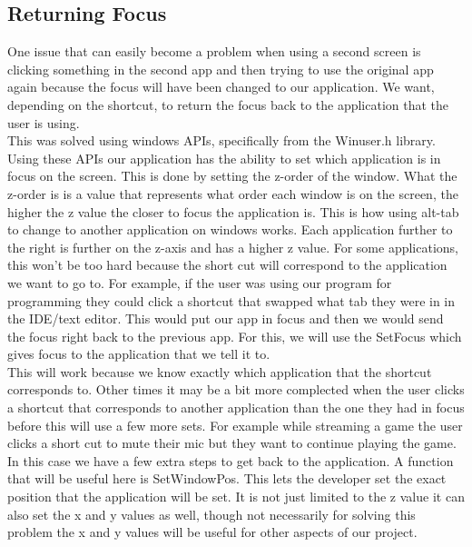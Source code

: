 \documentclass[fullpage, 10pt, onecolumn, draftclsnofoot]{IEEEtran}
\begin{document}
\subsection{Returning Focus}
One issue that can easily become a problem when using a second screen is clicking something in the second app and then trying to use the original app again because the focus will have been changed to our application. We want, depending on the shortcut, to return the focus back to the application that the user is using.\\
\newline
\indent This was solved using windows APIs, specifically from the Winuser.h library. Using these APIs our application has the ability to set which application is in focus on the screen. This is done by setting the z-order of the window. What the z-order is is a value that represents what order each window is on the screen, the higher the z value the closer to focus the application is. This is how using alt-tab to change to another application on windows works. Each application further to the right is further on the z-axis and has a higher z value. For some applications, this won’t be too hard because the short cut will correspond to the application we want to go to. For example, if the user was using our program for programming they could click a shortcut that swapped what tab they were in in the IDE/text editor. This would put our app in focus and then we would send the focus right back to the previous app. For this, we will use the SetFocus which gives focus to the application that we tell it to.  \\
\newline
\indent This will work because we know exactly which application that the shortcut corresponds to. Other times it may be a bit more complected when the user clicks a shortcut that corresponds to another application than the one they had in focus before this will use a few more sets. For example while streaming a game the user clicks a short cut to mute their mic but they want to continue playing the game. In this case we have a few extra steps to get back to the application. A function that will be useful here is SetWindowPos. This lets the developer set the exact position that the application will be set. It is not just limited to the z value it can also set the x and y values as well, though not necessarily for solving this problem the x and y values will be useful for other aspects of our project. \\
\newline
\end{document}
